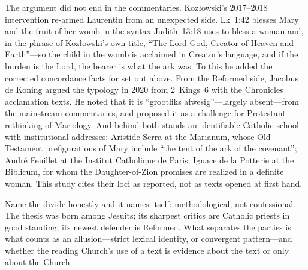 The argument did not end in the commentaries. Kozłowski's 2017--2018
intervention re-armed Laurentin from an unexpected side. Lk~1:42 blesses
Mary and the fruit of her womb in the syntax Judith~13:18 uses to bless a
woman and, in the phrase of Kozłowski's own title, ``The Lord God, Creator
of Heaven and Earth''---so the child in the womb is acclaimed in Creator's
language, and if the burden is the Lord, the bearer is what the ark was.
To this he added the corrected concordance facts for 
set out above. From the Reformed side, Jacobus de Koning argued the
typology in 2020 from 2~Kings~6 with the Chronicles acclamation texts. He
noted that it is ``grootliks afwesig''---largely absent---from the
mainstream commentaries, and proposed it as a challenge for Protestant
rethinking of Mariology. And behind
both stands an identifiable Catholic school with institutional addresses:
Aristide Serra at the Marianum, whose Old Testament prefigurations of
Mary include ``the tent of the ark of the covenant''; André Feuillet at
the Institut Catholique de Paris; Ignace de la Potterie at the Biblicum,
for whom the Daughter-of-Zion promises are realized in a definite woman.
This study cites their loci as reported, not as texts opened at first
hand.

Name the divide honestly and it names itself: methodological, not
confessional. The thesis was born among Jesuits; its sharpest critics are
Catholic priests in good standing; its newest defender is Reformed. What
separates the parties is what counts as an allusion---strict lexical
identity, or convergent pattern---and whether the reading Church's use of
a text is evidence about the text or only about the Church.

